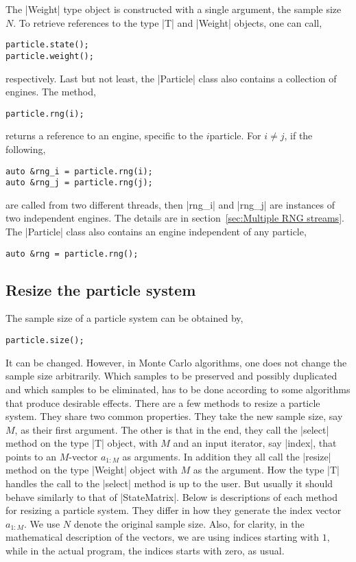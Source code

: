 The |Weight| type object is constructed with a single argument, the sample size
$N$. To retrieve references to the type |T| and |Weight| objects, one can call,
\begin{verbatim}
particle.state();
particle.weight();
\end{verbatim}
respectively. Last but not least, the |Particle| class also contains a
collection of \rng engines. The method,
\begin{verbatim}
particle.rng(i);
\end{verbatim}
returns a reference to an \rng engine, specific to the $i$\ith particle. For $i
\ne j$, if the following,
\begin{verbatim}
auto &rng_i = particle.rng(i);
auto &rng_j = particle.rng(j);
\end{verbatim}
are called from two different threads, then |rng_i| and |rng_j| are instances
of two independent \rng engines. The details are in section~\ref{sec:Multiple
RNG streams}. The |Particle| class also contains an \rng engine independent of
any particle,
\begin{verbatim}
auto &rng = particle.rng();
\end{verbatim}

\subsection{Resize the particle system}
\label{sub:Resize the particle system}

The sample size of a particle system can be obtained by,
\begin{verbatim}
particle.size();
\end{verbatim}
It can be changed. However, in Monte Carlo algorithms, one does not change the
sample size arbitrarily. Which samples to be preserved and possibly duplicated
and which samples to be eliminated, has to be done according to some algorithms
that produce desirable effects. There are a few methods to resize a particle
system. They share two common properties. They take the new sample size, say
$M$, as their first argument. The other is that in the end, they call the
|select| method on the type |T| object, with $M$ and an input iterator, say
|index|, that points to an $M$-vector $a_{1:M}$ as arguments. In addition they
all call the |resize| method on the type |Weight| object with $M$ as the
argument. How the type |T| handles the call to the |select| method is up to the
user. But usually it should behave similarly to that of |StateMatrix|. Below is
descriptions of each method for resizing a particle system. They differ in how
they generate the index vector $a_{1:M}$. We use $N$ denote the original sample
size. Also, for clarity, in the mathematical description of the vectors, we are
using indices starting with $1$, while in the actual program, the indices
starts with zero, as usual.

